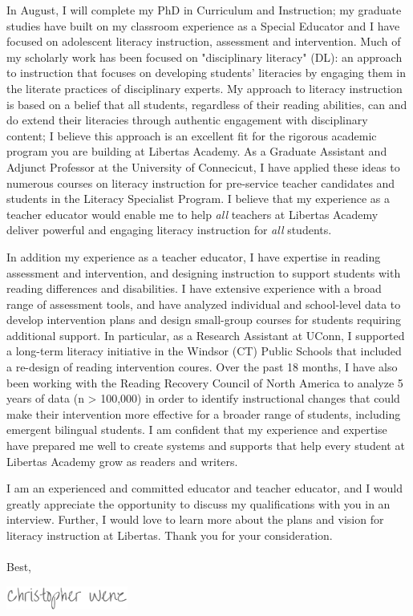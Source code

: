 \documentclass[11pt, a4paper]{awesome-cv}
\begin{document}
\begin{cvletter}
In August, I will complete my PhD in Curriculum and Instruction; my graduate studies have built on my classroom experience as a Special Educator and I have focused on adolescent literacy instruction, assessment and intervention. Much of my scholarly work has been focused on "disciplinary literacy" (DL): an approach to instruction that focuses on developing students' literacies by engaging them in the literate practices of disciplinary experts. My approach to literacy instruction is based on a belief that all students, regardless of their reading abilities, can and do extend their literacies through authentic engagement with disciplinary content; I believe this approach is an excellent fit for the rigorous academic program you are building at Libertas Academy. As a Graduate Assistant and Adjunct Professor at the University of Connecicut, I have applied these ideas to numerous courses on literacy instruction for pre-service teacher candidates and students in the Literacy Specialist Program. I believe that my experience as a teacher educator would enable me to help \emph{all} teachers at Libertas Academy deliver powerful and engaging literacy instruction for \emph{all} students. 

In addition my experience as a teacher educator, I have expertise in reading assessment and intervention, and designing instruction to support students with reading differences and disabilities. I have extensive experience with a broad range of assessment tools, and have analyzed individual and school-level data to develop intervention plans and design small-group courses for students requiring additional support. In particular, as a Research Assistant at UConn, I supported a long-term literacy initiative in the Windsor (CT) Public Schools that included a re-design of reading intervention coures. Over the past 18 months, I have also been working with the Reading Recovery Council of North America to analyze 5 years of data (n > 100,000) in order to identify instructional changes that could make their intervention more effective for a broader range of students, including emergent bilingual students. I am confident that my experience and expertise have prepared me well to create systems and supports that help every student at Libertas Academy grow as readers and writers. 

I am an experienced and committed educator and teacher educator, and I would greatly appreciate the opportunity to discuss my qualifications with you in an interview. Further, I would love to learn more about the plans and vision for literacy instruction at Libertas. Thank you for your consideration.  
\\\\
Best,
\end{cvletter}

\includegraphics[width=4cm, height=0.8cm]{./img/sig.png}
\end{document}

